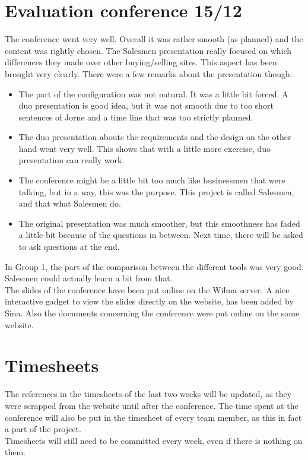 \documentclass[a4paper, 12pt]{article}
\begin{document}
	\section{Evaluation conference 15/12}
	The conference went very well. Overall it was rather smooth (as planned) and the content was rightly chosen. The Salesmen presentation really focused on which differences they made over other buying/selling sites. This aspect has been brought very clearly. There were a few remarks about the presentation though:
		\begin{itemize}
			\item The part of the configuration was not natural. It was a little bit forced. A duo presentation is good idea, but it was not smooth due to too short sentences of Jorne and a time line that was too strictly planned.
			\item The duo presentation abouts the requirements and the design on the other hand went very well. This shows that with a little more exercise, duo presentation can really work.
			\item The conference might be a little bit too much like businessmen that were talking, but in a way, this was the purpose. This project is called Salesmen, and that what Salesmen do.
			\item The original presentation was much smoother, but this smoothness has faded a little bit because of the questions in between. Next time, there will be asked to ask questions at the end.
		\end{itemize}
		
In Group 1, the part of the comparison between the different tools was very good. Salesmen could actually learn a bit from that.\\
The slides of the conference have been put online on the Wilma server. \cite{site1} A nice interactive gadget to view the slides directly on the website, has been added by Sina. Also the documents concerning the conference were put online on the same website.

	\section{Timesheets}
The references in the timesheets of the last two weeks will be updated, as they were scrapped from the website until after the conference. The time spent at the conference will also be put in the timesheet of every team member, as this in fact a part of the project. \\
Timesheets will still need to be committed every week, even if there is nothing on them.
\end{document}
